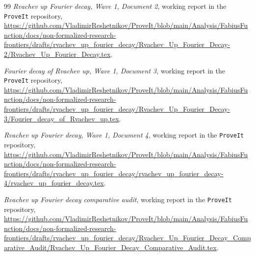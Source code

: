 \documentclass[11pt,oneside]{article}
\theoremstyle{definition}
\theoremstyle{remark}
\begin{document}
\begin{thebibliography}{99}
\emph{Rvachev up Fourier decay, Wave 1, Document 2}, working report in the
\texttt{ProveIt} repository,
\url{https://github.com/VladimirReshetnikov/ProveIt/blob/main/Analysis/FabiusFunction/docs/non-formalized-research-frontiers/drafts/rvachev_up_fourier_decay/Rvachev_Up_Fourier_Decay-2/Rvachev_Up_Fourier_Decay.tex}.

\emph{Fourier decay of Rvachev up, Wave 1, Document 3}, working report in the
\texttt{ProveIt} repository,
\url{https://github.com/VladimirReshetnikov/ProveIt/blob/main/Analysis/FabiusFunction/docs/non-formalized-research-frontiers/drafts/rvachev_up_fourier_decay/Rvachev_Up_Fourier_Decay-3/Fourier_decay_of_Rvachev_up.tex}.

\emph{Rvachev up Fourier decay, Wave 1, Document 4}, working report in the
\texttt{ProveIt} repository,
\url{https://github.com/VladimirReshetnikov/ProveIt/blob/main/Analysis/FabiusFunction/docs/non-formalized-research-frontiers/drafts/rvachev_up_fourier_decay/rvachev_up_fourier_decay-4/rvachev_up_fourier_decay.tex}.

\emph{Rvachev up Fourier decay comparative audit}, working report in the
\texttt{ProveIt} repository,
\url{https://github.com/VladimirReshetnikov/ProveIt/blob/main/Analysis/FabiusFunction/docs/non-formalized-research-frontiers/drafts/rvachev_up_fourier_decay/Rvachev_Up_Fourier_Decay_Comparative_Audit/Rvachev_Up_Fourier_Decay_Comparative_Audit.tex}.

\end{thebibliography}
\end{document}
